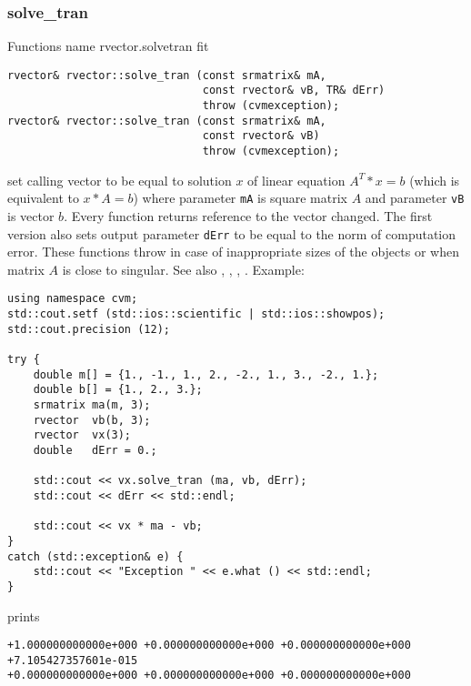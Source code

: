 \subsubsection{solve\_tran}
Functions%
\pdfdest name {rvector.solvetran} fit
\begin{verbatim}
rvector& rvector::solve_tran (const srmatrix& mA,
                              const rvector& vB, TR& dErr)
                              throw (cvmexception);
rvector& rvector::solve_tran (const srmatrix& mA,
                              const rvector& vB)
                              throw (cvmexception);
\end{verbatim}
set calling vector to be equal to solution $x$ of linear equation
$A^T*x=b$ (which is equivalent to $x*A=b$) 
where parameter \verb"mA" is  square matrix $A$
and parameter \verb"vB" is  vector $b$.
Every function returns  reference to the vector changed.
The first version also sets output parameter \verb"dErr" to be equal
to the norm of computation error.
These functions throw 
in case of inappropriate sizes
of the objects or when  matrix $A$ is close to singular.
See also , 
, , .
Example:
\begin{Verbatim}
using namespace cvm;
std::cout.setf (std::ios::scientific | std::ios::showpos);
std::cout.precision (12);

try {
    double m[] = {1., -1., 1., 2., -2., 1., 3., -2., 1.};
    double b[] = {1., 2., 3.};
    srmatrix ma(m, 3);
    rvector  vb(b, 3);
    rvector  vx(3);
    double   dErr = 0.;

    std::cout << vx.solve_tran (ma, vb, dErr);
    std::cout << dErr << std::endl;

    std::cout << vx * ma - vb;
}
catch (std::exception& e) {
    std::cout << "Exception " << e.what () << std::endl;
}
\end{Verbatim}
prints
\begin{Verbatim}
+1.000000000000e+000 +0.000000000000e+000 +0.000000000000e+000
+7.105427357601e-015
+0.000000000000e+000 +0.000000000000e+000 +0.000000000000e+000
\end{Verbatim}
\newpage



